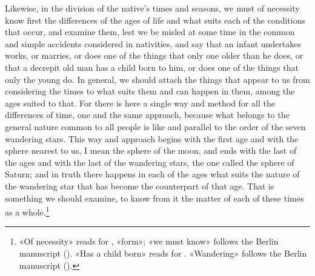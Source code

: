 \documentclass[11pt]{article}
\newcommand{\Fol}[1]{\marginpar{\footnotesize\color{gray}f.\,#1}}
\begin{document}
\par \Fol{75v}Likewise, in the division of the native's times and seasons, we must of necessity know first the differences of the ages of life and what suits each of the conditions that occur, and examine them, lest we be misled at some time in the common and simple accidents considered in nativities, and say that an infant undertakes works, or marries, or does one of the things that only one older than he does, or that a decrepit old man has a child born to him, or does one of the things that only the young do. In general, we should attach the things that appear to us from considering the times to what suits them and can happen in them, among the ages suited to that. For there is here a single way and method for all the differences of time, one and the same approach, because what belongs to the general nature common to all people is like and parallel to the order of the seven wandering stars. This way and approach begins with the first age and with the sphere nearest to us, I mean the sphere of the moon, and ends with the last of the ages and with the last of the wandering stars, the one called the sphere of Saturn; and in truth there happens in each of the ages what suits the nature of the wandering star that has become the counterpart of that age. That is something we should examine, to know from it the matter of each of these times as a whole.\footnote{«Of necessity» reads  for , «form»; «we must know» follows the Berlin manuscript (). «Has a child born» reads  for . «Wandering» follows the Berlin manuscript ().}\par
\end{document}
